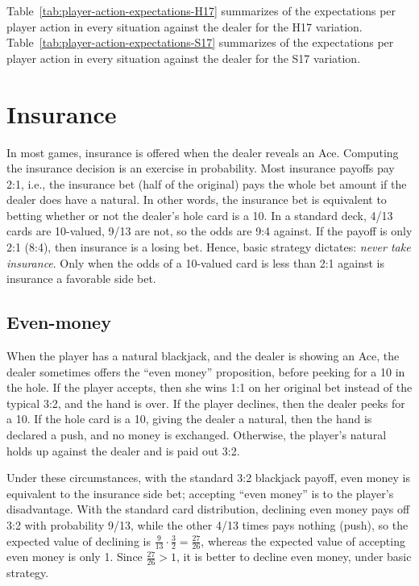 Table~\ref{tab:player-action-expectations-H17} summarizes of the
expectations per player action in every situation against the dealer
for the H17 variation.
Table~\ref{tab:player-action-expectations-S17} summarizes of the
expectations per player action in every situation against the dealer
for the S17 variation.

\section{Insurance}
\label{sec:basic:insurance}

In most games, insurance is offered when the dealer reveals an Ace.
Computing the insurance decision is an exercise in probability.
Most insurance payoffs pay 2:1, i.e., the insurance bet (half of the original)
pays the whole bet amount if the dealer does have a natural.
In other words, the insurance bet is equivalent to betting 
whether or not the dealer's hole card is a 10.
In a standard deck, 4/13 cards are 10-valued, 9/13 are not, 
so the odds are 9:4 against.  
If the payoff is only 2:1 (8:4), then insurance is a losing bet.
Hence, basic strategy dictates: \emph{never take insurance}.
Only when the odds of a 10-valued card is less than 2:1 against
is insurance a favorable side bet.

\subsection{Even-money}
\label{sec:basic:insurance:even-money}

When the player has a natural blackjack, and the dealer is showing an 
Ace, the dealer sometimes offers the ``even money'' proposition, 
before peeking for a 10 in the hole.
If the player accepts, then she wins 1:1 on her original bet
instead of the typical 3:2, and the hand is over.
If the player declines, then the dealer peeks for a 10.
If the hole card is a 10, giving the dealer a natural, then the hand
is declared a push, and no money is exchanged.
Otherwise, the player's natural holds up against the dealer
and is paid out 3:2.

Under these circumstances, with the standard 3:2 blackjack payoff, 
even money is equivalent to the insurance side bet;
accepting ``even money'' is to the player's disadvantage.
With the standard card distribution, 
declining even money pays off 3:2 with probability 9/13, 
while the other 4/13 times pays nothing (push), 
so the expected value of declining is
$\frac{9}{13}\cdot\frac{3}{2}=\frac{27}{26}$,
whereas the expected value of accepting even money is only 1.  
Since $\frac{27}{26}>1$, it is better to decline even money, 
under basic strategy.

